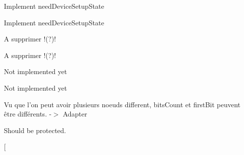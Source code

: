 \begin{DoxyRefList}
\item[\label{todo__todo000016}%
\hypertarget{todo__todo000016}{}%
Member \hyperlink{classmdt_device_modbus_wago_module_a92cf3b411849e57c1d392ffa1b2e2ce6}{mdt\-Device\-Modbus\-Wago\-Module\-:\-:write\-Control\-Bytes} (int first\-Channel, int last\-Channel, bool need\-Device\-Setup\-State)]Implement need\-Device\-Setup\-State  
\item[\label{todo__todo000014}%
\hypertarget{todo__todo000014}{}%
Member \hyperlink{classmdt_device_modbus_wago_module_a8fe809c91ccbf05f77c189fbaba12b91}{mdt\-Device\-Modbus\-Wago\-Module\-:\-:write\-Registers} (int first\-Channel, int last\-Channel, bool need\-Device\-Setup\-State)]Implement need\-Device\-Setup\-State  
\item[\label{todo__todo000009}%
\hypertarget{todo__todo000009}{}%
Class \hyperlink{classmdt_device_u3606_a_widget}{mdt\-Device\-U3606\-A\-Widget} ]A supprimer !(?)!  
\item[\label{todo__todo000008}%
\hypertarget{todo__todo000008}{}%
Member \hyperlink{classmdt_device_u3606_a_widget_a653d85749d67555d8c3a43a779b6d2a2}{mdt\-Device\-U3606\-A\-Widget\-:\-:mdt\-Device\-U3606\-A\-Widget} (\hyperlink{class_q_widget}{Q\-Widget} $\ast$parent=0)]A supprimer !(?)!  
\item[\label{todo__todo000097}%
\hypertarget{todo__todo000097}{}%
Member \hyperlink{classmdt_frame_codec_scpi_aa6596dc898438be704191ad282d02100}{mdt\-Frame\-Codec\-Scpi\-:\-:decode\-I\-E\-E\-Edata\-Ascii} (const Q\-Byte\-Array \&data)]Not implemented yet  
\item[\label{todo__todo000098}%
\hypertarget{todo__todo000098}{}%
Member \hyperlink{classmdt_frame_codec_scpi_ab70c6c3d2d91ddff065952b6c2db8345}{mdt\-Frame\-Codec\-Scpi\-:\-:decode\-I\-E\-E\-Edata\-Byte} (const Q\-Byte\-Array \&data)]Not implemented yet  
\item[\label{todo__todo000026}%
\hypertarget{todo__todo000026}{}%
Class \hyperlink{classmdt_modbus_hw_node_id_list}{mdt\-Modbus\-Hw\-Node\-Id\-List} ]Vu que l'on peut avoir plusieurs noeuds different, bits\-Count et first\-Bit peuvent être différents. -\/$>$ Adapter  
\item[\label{todo__todo000027}%
\hypertarget{todo__todo000027}{}%
Member \hyperlink{classmdt_modbus_tcp_port_manager_aefc317fd2714a81fabb6fef84251f73c}{mdt\-Modbus\-Tcp\-Port\-Manager\-:\-:find\-Matching\-To\-Host\-Modebus\-Hw\-Node\-Id} (const \hyperlink{classmdt_modbus_hw_node_id_list}{mdt\-Modbus\-Hw\-Node\-Id\-List} \&hw\-Node\-Id\-List)]Should be protected.  
\item[\label{todo__todo000018}%

\end{DoxyRefList}
